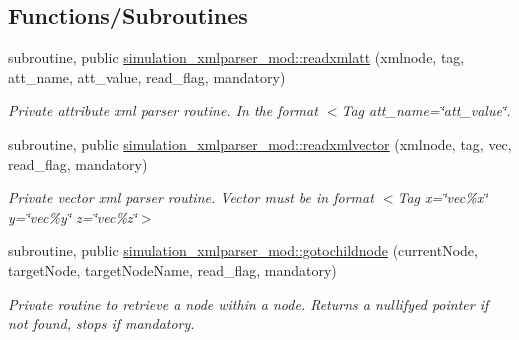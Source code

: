 \subsection*{Functions/\+Subroutines}
\begin{DoxyCompactItemize}
\item 
subroutine, public \mbox{\hyperlink{namespacesimulation__xmlparser__mod_ab062c8e064b043446d4f6ac695b306ab}{simulation\+\_\+xmlparser\+\_\+mod\+::readxmlatt}} (xmlnode, tag, att\+\_\+name, att\+\_\+value, read\+\_\+flag, mandatory)
\begin{DoxyCompactList}\small\item\em Private attribute xml parser routine. In the format $<$Tag att\+\_\+name=\char`\"{}att\+\_\+value\char`\"{}. \end{DoxyCompactList}\item 
subroutine, public \mbox{\hyperlink{namespacesimulation__xmlparser__mod_a48bcd153bef2149410d66842b564728d}{simulation\+\_\+xmlparser\+\_\+mod\+::readxmlvector}} (xmlnode, tag, vec, read\+\_\+flag, mandatory)
\begin{DoxyCompactList}\small\item\em Private vector xml parser routine. Vector must be in format $<$\+Tag x=\char`\"{}vec\%x\char`\"{} y=\char`\"{}vec\%y\char`\"{} z=\char`\"{}vec\%z\char`\"{}$>$ \end{DoxyCompactList}\item 
subroutine, public \mbox{\hyperlink{namespacesimulation__xmlparser__mod_a3167fcb99b40cdc25d2ba18418bd8b9f}{simulation\+\_\+xmlparser\+\_\+mod\+::gotochildnode}} (current\+Node, target\+Node, target\+Node\+Name, read\+\_\+flag, mandatory)
\begin{DoxyCompactList}\small\item\em Private routine to retrieve a node within a node. Returns a nullifyed pointer if not found, stops if mandatory. \end{DoxyCompactList}\end{DoxyCompactItemize}
